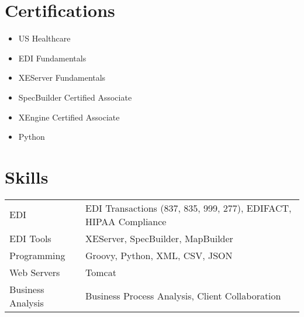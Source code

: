 \documentclass[a4paper,11pt]{article}
\begin{document}
\section{Certifications}
\begin{multicols}{2}
\begin{itemize}[leftmargin=1em]
    \item US Healthcare
    \item EDI Fundamentals
    \item XEServer Fundamentals
    \item SpecBuilder Certified Associate
    \item XEngine Certified Associate
    \item Python
\end{itemize}
\end{multicols}

\section{Skills}
\begin{tabularx}{\linewidth}{@{}l X@{}}
EDI & EDI Transactions (837, 835, 999, 277), EDIFACT, HIPAA Compliance \\
EDI Tools & XEServer, SpecBuilder, MapBuilder \\
Programming & Groovy, Python, XML, CSV, JSON \\
Web Servers & Tomcat \\
Business Analysis & Business Process Analysis, Client Collaboration \\
\end{tabularx}

\vfill
{}
\end{document}
